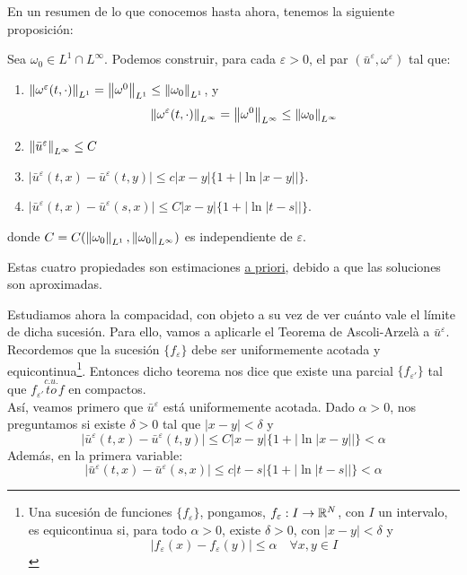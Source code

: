 

En un resumen de lo que conocemos hasta ahora, tenemos la siguiente proposición:

\begin{prop}
    Sea $\omega_0 \in L^1 \cap L^\infty$. Podemos construir, para cada $\varepsilon > 0$, el par $(\bar{u}^\varepsilon, \omega^\varepsilon)$ tal que:
    \begin{enumerate}
        \item $\left\lVert \omega^\varepsilon(t, \cdot) \right\rVert_{L^1} = \left\lVert \omega^0 \right\rVert_{L^1} \leq \left\lVert \omega_0 \right\rVert_{L^1}$, y 
        $$\left\lVert \omega^\varepsilon(t, \cdot) \right\rVert_{L^\infty} = \left\lVert \omega^0 \right\rVert_{L^\infty} \leq \left\lVert \omega_0 \right\rVert_{L^\infty}$$
        \item $\left\lVert \bar{u}^\varepsilon \right\rVert_{L^\infty} \leq C$
        \item $|\bar{u}^\varepsilon(t,x) - \bar{u}^\varepsilon(t,y)| \leq c|x-y| \{1 + |\ln|x-y||\}$.
        \item $|\bar{u}^\varepsilon(t,x) - \bar{u}^\varepsilon(s,x)| \leq C|x-y| \{1 + |\ln|t-s||\}$.
    \end{enumerate} 
    donde $C = C(\left\lVert \omega_0 \right\rVert_{L^1}, \left\lVert \omega_0 \right\rVert_{L^\infty})$ es independiente de $\varepsilon$.
\end{prop}

\begin{observacion}
    Estas cuatro propiedades son estimaciones \underline{a priori}, debido a que las soluciones son aproximadas.
\end{observacion}

Estudiamos ahora la compacidad, con objeto a su vez de ver cuánto vale el límite de dicha sucesión. Para ello, vamos a aplicarle 
el Teorema de Ascoli-Arzelà a $\bar{u}^\varepsilon$. Recordemos que la sucesión $\{f_\varepsilon\}$ debe ser uniformemente acotada y 
equicontinua\footnote{Una sucesión de funciones $\{f_\varepsilon\}$, pongamos, $f_\varepsilon : I \to \mathbb{R}^N$, con $I$ un intervalo, es equicontinua si, para todo $\alpha > 0$, 
existe $\delta > 0$, con $|x-y| < \delta$ y $$|f_\varepsilon(x) - f_\varepsilon(y)| \leq \alpha \quad \forall x,y \in I$$}.
Entonces dicho teorema nos dice que existe una parcial $\{f_{\varepsilon'}\}$ tal que $f_{\varepsilon'} \stackrel{c.u.}{to} f$ en compactos. \\

Así, veamos primero que $\bar{u}^\varepsilon$ está uniformemente acotada. Dado $\alpha > 0$, nos preguntamos si existe $\delta > 0$ tal que $|x-y| < \delta$ y
$$|\bar{u}^\varepsilon(t,x) - \bar{u}^\varepsilon(t,y)| \leq C |x-y|\{1 + |\ln|x-y||\} < \alpha$$
Además, en la primera variable:
$$|\bar{u}^\varepsilon(t,x) - \bar{u}^\varepsilon(s,x)| \leq c |t-s|\{1 + |\ln|t-s||\} < \alpha$$

